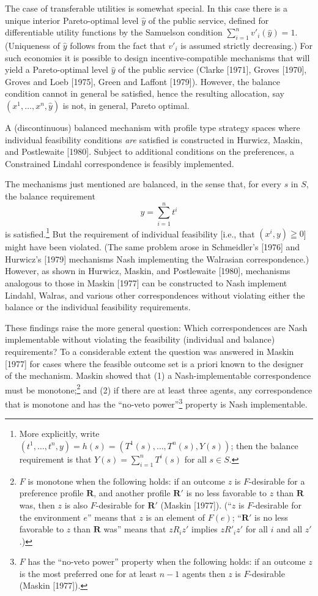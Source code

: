 \documentclass[12pt, letterpaper]{article}
\begin{document}
The case of transferable utilities is somewhat special. In this case there is a unique interior Pareto-optimal level $\hat{y}$ of the public service, defined for differentiable utility functions by the Samuelson condition $\sum_{i=1}^n v'_i(\hat{y}) = 1$. (Uniqueness of $\hat{y}$ follows from the fact that $v'_i$ is assumed strictly decreasing.) For such economies it is possible to design incentive-compatible mechanisms that will yield a Pareto-optimal level $\hat{y}$ of the public service (Clarke [1971], Groves [1970], Groves and Loeb [1975], Green and Laffont [1979]). However, the balance condition cannot in general be satisfied, hence the resulting allocation, say $(x^1, \dots, x^n, \hat{y})$ is not, in general, Pareto optimal.

A (discontinuous) balanced mechanism with profile type strategy spaces where individual feasibility conditions \textit{are} satisfied is constructed in Hurwicz, Maskin, and Postlewaite [1980]. Subject to additional conditions on the preferences, a Constrained Lindahl correspondence is feasibly implemented.

The mechanisms just mentioned are balanced, in the sense that, for every $s$ in $S$, the balance requirement
\[
y = \sum_{i=1}^{n} t^i
\]
is satisfied.\footnote{More explicitly, write $(t^1, \dots, t^n, y) = h(s) = (T^1(s), \dots, T^n(s), Y(s))$; then the balance requirement is that $Y(s) = \sum_{i=1}^n T^i(s)$ for all $s \in S$.} But the requirement of individual feasibility [i.e., that $(x^i, y) \geqq 0$] might have been violated. (The same problem arose in Schmeidler's [1976] and Hurwicz's [1979] mechanisms Nash implementing the Walrasian correspondence.) However, as shown in Hurwicz, Maskin, and Postlewaite [1980], mechanisms analogous to those in Maskin [1977] can be constructed to Nash implement Lindahl, Walras, and various other correspondences without violating either the balance or the individual feasibility requirements.

These findings raise the more general question: Which correspondences are Nash implementable without violating the feasibility (individual and balance) requirements? To a considerable extent the question was answered in Maskin [1977] for cases where the feasible outcome set is a priori known to the designer of the mechanism. Maskin showed that (1) a Nash-implementable correspondence must be monotone;\footnote{$F$ is monotone when the following holds: if an outcome $z$ is $F$-desirable for a preference profile $\mathbf{R}$, and another profile $\mathbf{R}'$ is no less favorable to $z$ than $\mathbf{R}$ was, then $z$ is also $F$-desirable for $\mathbf{R}'$ (Maskin [1977]). (``$z$ is $F$-desirable for the environment $e$'' means that $z$ is an element of $F(e)$; ``$\mathbf{R}'$ is no less favorable to $z$ than $\mathbf{R}$ was'' means that $z R_i z'$ implies $z R'_i z'$ for all $i$ and all $z'$.)} and (2) if there are at least three agents, any correspondence that is monotone and has the ``no-veto power''\footnote{$F$ has the ``no-veto power'' property when the following holds: if an outcome $z$ is the most preferred one for at least $n - 1$ agents then $z$ is $F$-desirable (Maskin [1977]).} property is Nash implementable.
\end{document}
